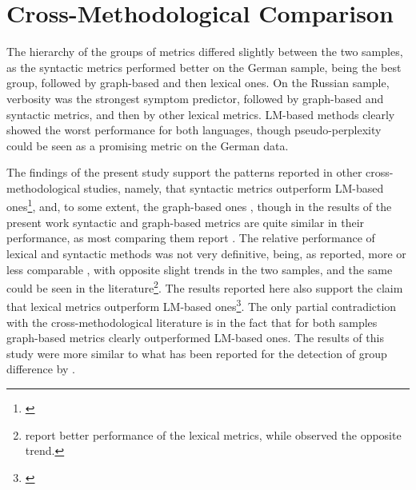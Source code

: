 \section{Cross-Methodological Comparison}
\label{sec:discussion:cross-method}

The hierarchy of the groups of metrics differed slightly between the two samples, as the syntactic metrics performed better on the German sample, being the best group, followed by graph-based and then lexical ones. On the Russian sample, verbosity was the strongest symptom predictor, followed by graph-based and syntactic metrics, and then by other lexical metrics. LM-based methods clearly showed the worst performance for both languages, though pseudo-perplexity could be seen as a promising metric on the German data.

The findings of the present study support the patterns reported in other cross-methodological studies, namely, that syntactic metrics outperform LM-based ones\footnote{\cite{mitchell2015quantifying, iter2018automatic, corcoran2018prediction, just2020modeling, morgan2021natural, bilgrami2022construct, liebenthal2022linguistic, argolo2023burnishing}}, and, to some extent, the graph-based ones \citep{argolo2023burnishing}, though in the results of the present work syntactic and graph-based metrics are quite similar in their performance, as most comparing them report \citep{mitchell2015quantifying, just2020modeling, jeong2023exploring}. The relative performance of lexical and syntactic methods was not very definitive, being, as reported, more or less comparable \citep{mitchell2015quantifying, just2020modeling, jeong2023exploring}, with opposite slight trends in the two samples, and the same could be seen in the literature\footnote{\cite{gupta2018automated, rezaii2019machine} report better performance of the lexical metrics, while \citet{schneider2023syntactic, argolo2023burnishing} observed the opposite trend.}. The results reported here also support the claim that lexical metrics outperform LM-based ones\footnote{\cite{mitchell2015quantifying, just2019coherence, just2020modeling, hitczenko2021understanding, aich2022towards, girard2022computational}}. The only partial contradiction with the cross-methodological literature \citep{argolo2023burnishing} is in the fact that for both samples graph-based metrics clearly outperformed LM-based ones. The results of this study were more similar to what has been reported for the detection of group difference by \citet{morgan2021natural}.

